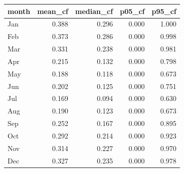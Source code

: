 \begin{tabular}{lrrrr}
\toprule
month & mean_cf & median_cf & p05_cf & p95_cf \\
\midrule
Jan & 0.388 & 0.296 & 0.000 & 1.000 \\
Feb & 0.373 & 0.286 & 0.000 & 0.998 \\
Mar & 0.331 & 0.238 & 0.000 & 0.981 \\
Apr & 0.215 & 0.132 & 0.000 & 0.798 \\
May & 0.188 & 0.118 & 0.000 & 0.673 \\
Jun & 0.202 & 0.125 & 0.000 & 0.751 \\
Jul & 0.169 & 0.094 & 0.000 & 0.630 \\
Aug & 0.190 & 0.123 & 0.000 & 0.673 \\
Sep & 0.252 & 0.167 & 0.000 & 0.895 \\
Oct & 0.292 & 0.214 & 0.000 & 0.923 \\
Nov & 0.314 & 0.227 & 0.000 & 0.970 \\
Dec & 0.327 & 0.235 & 0.000 & 0.978 \\
\bottomrule
\end{tabular}
